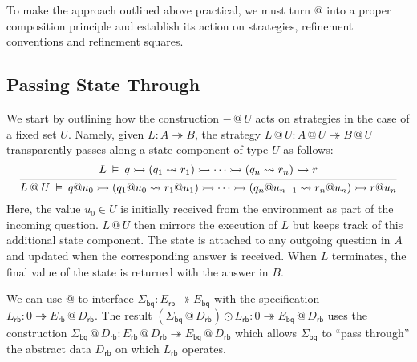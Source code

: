 \documentclass[acmsmall,nonacm]{acmart}
\newcommand{\kw}[1]{\ensuremath{ \mathsf{#1} }}
\newcommand{\emptysig}{0}
\begin{document}
To make the approach outlined above practical,
we must turn $@$ into a proper composition principle
and establish its action on
strategies,
refinement conventions and
refinement squares.


\subsection{Passing State Through} \label{sec:overview:slift} %

We start by
outlining how the construction ${-} \mathbin@ U$
acts on strategies
in the case of a fixed set $U$.
Namely,
given $L : A \twoheadrightarrow B$,
the strategy
$
  L \mathbin@ U : A \mathbin@ U \twoheadrightarrow B \mathbin@ U
$
transparently passes along
a state component of type $U$ as follows:
\begin{equation} \label{eqn:slift}
  \begin{prooftree}
  \hypo{
  L \:\vDash\: q \rightarrowtail
    (q_1 \leadsto r_1) \rightarrowtail
    \cdots \rightarrowtail
    (q_n \leadsto r_n) \rightarrowtail
    r
  }
  \infer1{
  L \mathbin@ U \:\vDash\: q@u_0 \rightarrowtail
    (q_1@u_0 \leadsto r_1@u_1) \rightarrowtail
    \cdots \rightarrowtail
    (q_n@u_{n-1} \leadsto r_n@u_n) \rightarrowtail
    r@u_n
  }
  \end{prooftree}
\end{equation}
Here, the value $u_0 \in U$
is initially received from the environment as part of the incoming question.
$L \mathbin@ U$ then mirrors the execution of $L$
but keeps track of this additional state component.
The state is attached to any outgoing question in $A$
and updated when the corresponding answer is received.
When $L$ terminates,
the final value of the state is returned with the answer in $B$.


\begin{example} \label{ex:abspeclift} %
We can use $\mathbin@$ to interface
$\Sigma_\kw{bq} : E_\kw{rb} \twoheadrightarrow E_\kw{bq}$ with the specification
$L_\kw{rb} : \emptysig \twoheadrightarrow E_\kw{rb} \mathbin@ D_\kw{rb}$.
The result
$
  (\Sigma_\kw{bq} \mathbin@ D_\kw{rb}) \odot L_\kw{rb} :
  \emptysig \twoheadrightarrow E_\kw{bq} \mathbin@ D_\kw{rb}
$
uses the construction
$\Sigma_\kw{bq} \mathbin@ D_\kw{rb} :
 E_\kw{rb} \mathbin@ D_\kw{rb}
 \twoheadrightarrow
 E_\kw{bq} \mathbin@ D_\kw{rb}$
which allows $\Sigma_\kw{bq}$ to
``pass through'' the abstract data $D_\kw{rb}$
on which $L_\kw{rb}$ operates.
\end{example}
\end{document}
